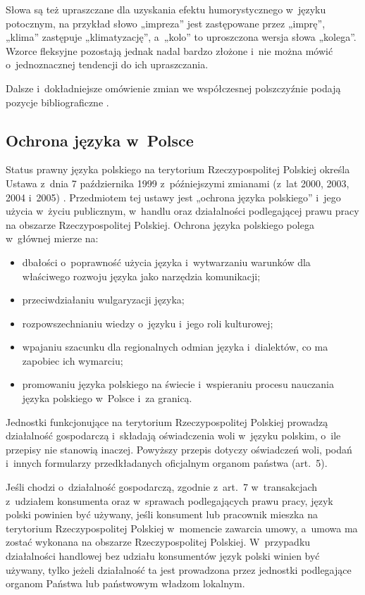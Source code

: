 \begin{multicols}{2}
Słowa są też upraszczane dla uzyskania efektu humorystycznego
w~języku potocznym, na przykład słowo „impreza” jest
zastępowane przez „imprę”, „klima” zastępuje
„klimatyzację”, a~„kolo” to uproszczona wersja słowa
„kolega”. Wzorce fleksyjne pozostają jednak nadal bardzo
złożone i~nie można mówić o~jednoznacznej tendencji do ich
upraszczania. 

Dalsze i~dokładniejsze omówienie zmian we współczesnej
polszczyźnie podają pozycje bibliograficzne \cite{Bralczyk1,
Grzenia1, Lazinski1, Mazur1, Bralczyk2}. 

\subsection[Ochrona języka w~Polsce]{Ochrona języka w~Polsce} Status
prawny języka polskiego na terytorium Rzeczypospolitej Polskiej
określa Ustawa z~dnia 7 października 1999 z~późniejszymi zmianami
(z~lat 2000, 2003, 2004 i~2005) \cite{Efnil1}. Przedmiotem tej ustawy
jest „ochrona języka polskiego” i~jego użycia w~życiu
publicznym, w~handlu oraz działalności podlegającej prawu pracy na
obszarze Rzeczypospolitej Polskiej. Ochrona języka polskiego polega
w~głównej mierze na: \begin{itemize} \item dbałości o~poprawność
użycia języka i~wytwarzaniu warunków dla właściwego rozwoju
języka jako narzędzia komunikacji; \item przeciwdziałaniu
wulgaryzacji języka; \item rozpowszechnianiu wiedzy o~języku i~jego
roli kulturowej; \item wpajaniu szacunku dla regionalnych odmian
języka i~dialektów, co ma zapobiec ich wymarciu; \item promowaniu
języka polskiego na świecie i~wspieraniu procesu nauczania języka
polskiego w~Polsce i~za granicą. \end{itemize} 

Jednostki funkcjonujące na terytorium Rzeczypospolitej Polskiej
prowadzą działalność gospodarczą i~składają oświadczenia woli
w~języku polskim, o~ile przepisy nie stanowią inaczej. Powyższy
przepis dotyczy oświadczeń woli, podań i~innych formularzy
przedkładanych oficjalnym organom państwa (art.~5). 

Jeśli chodzi o~działalność gospodarczą, zgodnie z~art.~7
w~transakcjach z~udziałem konsumenta oraz w~sprawach podlegających
prawu pracy, język polski powinien być używany, jeśli konsument
lub pracownik mieszka na terytorium Rzeczypospolitej Polskiej
w~momencie zawarcia umowy, a~umowa ma zostać wykonana na obszarze
Rzeczypospolitej Polskiej. W~przypadku działalności handlowej bez
udziału konsumentów język polski winien być używany, tylko
jeżeli działalność ta jest prowadzona przez jednostki podlegające
organom Państwa lub państwowym władzom lokalnym. 


\end{multicols}
